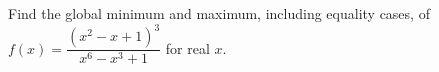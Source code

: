 Find the global minimum and maximum, including equality cases, of $f(x)=\dfrac{(x^2-x+1)^3}{x^6-x^3+1}$ for real $x$.
